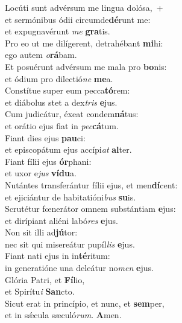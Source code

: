 \evenverse Locúti sunt advérsum me lingua dolósa,~+\\\evenverse  et sermónibus ódii circumde\textbf{dé}runt me:~\*\\
\evenverse et expugnavérunt \textit{me} \textbf{gra}tis.\\
\oddverse Pro eo ut me dilígerent, detrahébant \textbf{mi}hi:~\*\\
\oddverse ego autem \textit{o}\textbf{rá}bam.\\
\evenverse Et posuérunt advérsum me mala pro \textbf{bo}nis:~\*\\
\evenverse et ódium pro dilectió\textit{ne} \textbf{me}a.\\
\oddverse Constítue super eum pecca\textbf{tó}rem:~\*\\
\oddverse et diábolus stet a dex\textit{tris} \textbf{e}jus.\\
\evenverse Cum judicátur, éxeat condem\textbf{ná}tus:~\*\\
\evenverse et orátio ejus fiat in \textit{pec}\textbf{cá}tum.\\
\oddverse Fiant dies ejus \textbf{pau}ci:~\*\\
\oddverse et episcopátum ejus accípi\textit{at} \textbf{al}ter.\\
\evenverse Fiant fílii ejus \textbf{ór}phani:~\*\\
\evenverse et uxor e\textit{jus} \textbf{ví}\textbf{du}a.\\
\oddverse Nutántes transferántur fílii ejus, et men\textbf{dí}cent:~\*\\
\oddverse et ejiciántur de habitatióni\textit{bus} \textbf{su}is.\\
\evenverse Scrutétur fœnerátor omnem substántiam \textbf{e}jus:~\*\\
\evenverse et dirípiant aliéni labó\textit{res} \textbf{e}jus.\\
\oddverse Non sit illi ad\textbf{jú}tor:~\*\\
\oddverse nec sit qui misereátur pupíl\textit{lis} \textbf{e}jus.\\
\evenverse Fiant nati ejus in in\textbf{té}ritum:~\*\\
\evenverse in generatióne una deleátur no\textit{men} \textbf{e}jus.\\
\oddverse Glória Patri, et \textbf{Fí}lio,~\*\\
\oddverse et Spirítu\textit{i} \textbf{San}cto.\\
\evenverse Sicut erat in princípio, et nunc, et \textbf{sem}per,~\*\\
\evenverse et in sǽcula sæculó\textit{rum}. \textbf{A}men.\\
